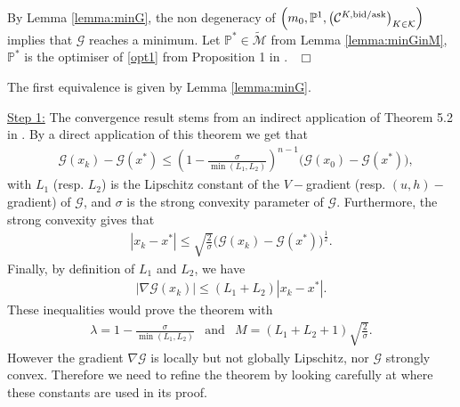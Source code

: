 \documentclass{amsart}%
\def\be{\begin{eqnarray}}
\def\ee{\end{eqnarray}}
\def\b*{\begin{eqnarray*}}
\def\e*{\end{eqnarray*}}
\def \P{{\mathbb P}}
\def\Cc{{\cal C}}
\def\Gc{{\cal G}}
\def\Kc{{\cal K}}
\def\no{\noindent}
\def \ep{\hbox{ }\hfill{ ${\cal t}$~\hspace{-5.1mm}~${\cal u}$   } }
\def \ep{\hbox{ }\hfill$\Box$}
\theoremstyle{definition}
\theoremstyle{remark}
\newcommand{\PP}{\mathbb{P}}
\newcommand{\cal}{\mathcal}
\begin{document}
\no By Lemma \ref{lemma:minG}, the non degeneracy of $\left(m_0, \P^1, \left(\Cc^{K,{\rm bid/ask}}\right)_{K\in\Kc}\right)$ implies that $\Gc$ reaches a minimum. Let $\PP^* \in \widetilde{\cal M}$ from Lemma \ref{lemma:minGinM}, $\P^*$ is the optimiser of \eqref{opt1} from Proposition 1 in \cite{avellaneda1998minimum}.
\ep










\no{\bf Proof of Theorem \ref{thm:convergence}}
The first equivalence is given by Lemma \ref{lemma:minG}.


\no\underline{\rm Step 1:} The convergence result stems from an indirect application of Theorem 5.2 in \cite{beck2013convergence}. By a direct application of this theorem we get that
\be
&\Gc(x_k)-\Gc(x^*)\le \left(1-\frac{\sigma}{\min(L_1,L_2)}\right)^{n-1}\big(\Gc(x_0)-\Gc(x^*)\big),\label{eq:convergence_Beck2}
\ee
with $L_1$ (resp. $L_2$) is the Lipschitz constant of the $V-$gradient (resp. $(u,h)-$gradient) of $\Gc$, and $\sigma$ is the strong convexity parameter of $\Gc$. Furthermore, the strong convexity gives that
\be\label{eq:distance_from_conv}
|x_k-x^*|\le \sqrt{\frac{2}{\sigma}}\big(\Gc(x_k)-\Gc(x^*)\big)^{\frac12}.
\ee
Finally, by definition of $L_1$ and $L_2$, we have
\be\label{eq:control_gradient}
|\nabla \Gc(x_k)|\le (L_1+L_2)|x_k-x^*|.
\ee
These inequalities would prove the theorem with
\b*
\lambda = 1-\frac{\sigma}{\min(L_1,L_2)}&\mbox{and}&M=(L_1+L_2+1)\sqrt{\frac{2}{\sigma}}.
\e*
However the gradient $\nabla \Gc$ is locally but not globally Lipschitz, nor $\Gc$ strongly convex. Therefore we need to refine the theorem by looking carefully at where these constants are used in its proof.
\end{document}
